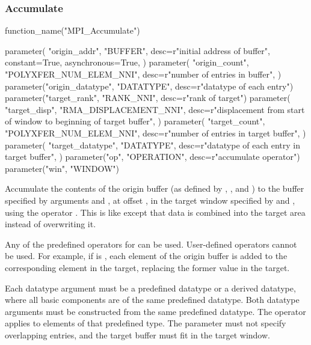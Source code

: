 \subsubsection{Accumulate}

%
%
%
\begin{mpi-binding}
    function_name("MPI_Accumulate")
    
    parameter(
        "origin_addr",
        "BUFFER",
        desc=r"initial address of buffer",
        constant=True,
        asynchronous=True,
    )
    parameter(
        "origin_count",
        "POLYXFER_NUM_ELEM_NNI",
        desc=r"number of entries in buffer",
    )
    parameter("origin_datatype", "DATATYPE", desc=r"datatype of each entry")
    parameter("target_rank", "RANK_NNI", desc=r"rank of target")
    parameter(
        "target_disp",
        "RMA_DISPLACEMENT_NNI",
        desc=r"displacement from start of window to beginning of target buffer",
    )
    parameter(
        "target_count",
        "POLYXFER_NUM_ELEM_NNI",
        desc=r"number of entries in target buffer",
    )
    parameter(
        "target_datatype",
        "DATATYPE",
        desc=r"datatype of each entry in target buffer",
    )
    parameter("op", "OPERATION", desc=r"accumulate operator")
    parameter("win", "WINDOW")
\end{mpi-binding}

Accumulate the contents of the origin buffer
(as defined by ,
, and 
)
to the buffer specified by arguments  and
,
at offset , in
the target window specified by  and ,
using the operator
.
This is like  except that data is combined into
the target area instead of overwriting it.

Any of the predefined operators for  can be
used.  User-defined operators cannot be used.
For example, if  is ,
each element of the origin buffer is added to the corresponding element
in the target, replacing the former value in the target.

Each datatype argument must be a predefined datatype or a derived
datatype, where all basic components are of the same predefined
datatype.  Both datatype arguments must be constructed from the same
predefined datatype.
The operator  applies to elements of that predefined
type. The parameter  must not specify overlapping 
entries, and the target buffer must fit in the target window.

